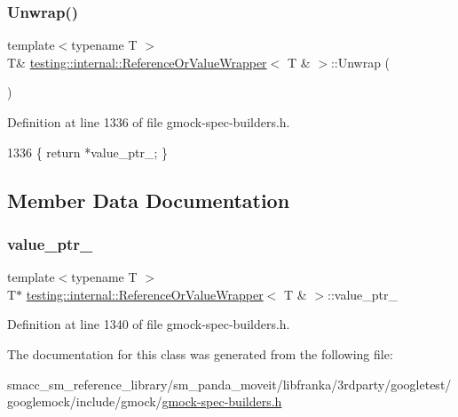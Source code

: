 \subsubsection{\texorpdfstring{Unwrap()}{Unwrap()}}
{\footnotesize\ttfamily template$<$typename T $>$ \\
T\& \hyperlink{classtesting_1_1internal_1_1ReferenceOrValueWrapper}{testing\+::internal\+::\+Reference\+Or\+Value\+Wrapper}$<$ T \& $>$\+::Unwrap (\begin{DoxyParamCaption}{ }\end{DoxyParamCaption})\hspace{0.3cm}{\ttfamily [inline]}}



Definition at line 1336 of file gmock-\/spec-\/builders.\+h.


\begin{DoxyCode}
1336 \{ \textcolor{keywordflow}{return} *value\_ptr\_; \}
\end{DoxyCode}


\subsection{Member Data Documentation}
\mbox{\label{classtesting_1_1internal_1_1ReferenceOrValueWrapper_3_01T_01_6_01_4_a16e7ba51d763d4992837a62c770c91f1}} 
\subsubsection{\texorpdfstring{value\+\_\+ptr\+\_\+}{value\_ptr\_}}
{\footnotesize\ttfamily template$<$typename T $>$ \\
T$\ast$ \hyperlink{classtesting_1_1internal_1_1ReferenceOrValueWrapper}{testing\+::internal\+::\+Reference\+Or\+Value\+Wrapper}$<$ T \& $>$\+::value\+\_\+ptr\+\_\+\hspace{0.3cm}{\ttfamily [private]}}



Definition at line 1340 of file gmock-\/spec-\/builders.\+h.



The documentation for this class was generated from the following file\+:\begin{DoxyCompactItemize}
\item 
smacc\+\_\+sm\+\_\+reference\+\_\+library/sm\+\_\+panda\+\_\+moveit/libfranka/3rdparty/googletest/googlemock/include/gmock/\hyperlink{gmock-spec-builders_8h}{gmock-\/spec-\/builders.\+h}\end{DoxyCompactItemize}
